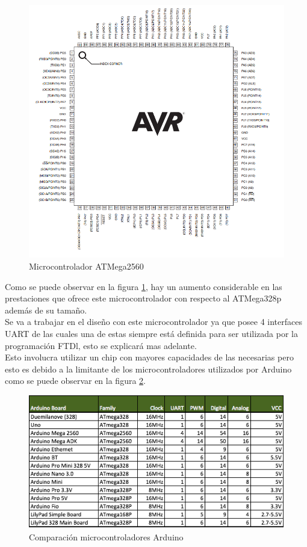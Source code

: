 \begin{figure}[H]
\centering
\includegraphics[scale=0.5]{figuras/mcu/2560.png}
\caption{Microcontrolador ATMega2560}
\label{mega}
\end{figure}

Como se puede observar en la figura \ref{mega}, hay un aumento considerable en las prestaciones que ofrece este microcontrolador con respecto al ATMega328p además de su tamaño. \\

Se va a trabajar en el diseño con este microcontrolador ya que posee 4 interfaces UART de las cuales una de estas siempre está definida para ser utilizada por la programación FTDl, esto se explicará mas adelante.\\

Esto involucra utilizar un chip con mayores capacidades de las necesarias pero esto es debido a la limitante de los microcontroladores utilizados por Arduino como se puede observar en la figura \ref{compara}.

\begin{figure}[H]
\centering
\includegraphics[scale=0.7]{figuras/mcu/compara.png}
\caption{Comparación microcontroladores Arduino}
\label{compara}
\end{figure}


